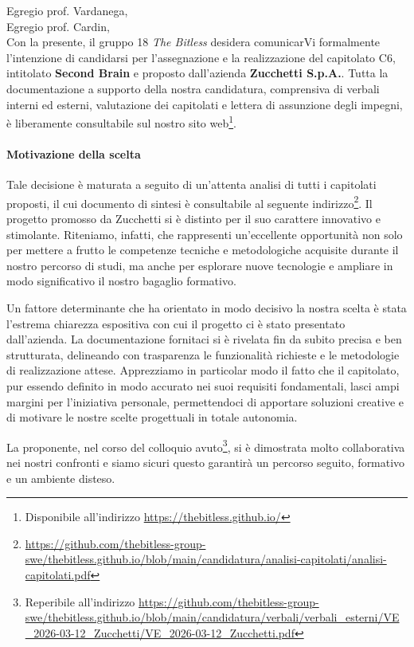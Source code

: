 \documentclass[a4paper, 10pt, colorlinks=true, linkcolor=black, urlcolor=blue, citecolor=blue, hidelinks]{article}
\begin{document}

\newpage

\noindent Egregio prof. Vardanega, \\
Egregio prof. Cardin, \\

\noindent Con la presente, il gruppo 18 \textit{The Bitless} desidera comunicarVi formalmente l'intenzione di candidarsi per l'assegnazione e la realizzazione del capitolato C6, intitolato \textbf{Second Brain} e proposto dall'azienda \textbf{Zucchetti S.p.A.}.
Tutta la documentazione a supporto della nostra candidatura, comprensiva di verbali interni ed esterni, valutazione dei capitolati e lettera di assunzione degli impegni, è liberamente consultabile sul nostro sito web\footnote{Disponibile all'indirizzo \url{https://thebitless.github.io/}}.

\paragraph{Motivazione della scelta}
Tale decisione è maturata a seguito di un'attenta analisi di tutti i capitolati proposti, il cui documento di sintesi è consultabile al seguente indirizzo\footnote{\url{https://github.com/thebitless-group-swe/thebitless.github.io/blob/main/candidatura/analisi-capitolati/analisi-capitolati.pdf}}.
Il progetto promosso da Zucchetti si è distinto per il suo carattere innovativo e stimolante. Riteniamo, infatti, che rappresenti un'eccellente opportunità non solo per mettere a frutto le competenze tecniche e metodologiche acquisite durante il nostro percorso di studi, ma anche per esplorare nuove tecnologie e ampliare in modo significativo il nostro bagaglio formativo. 

Un fattore determinante che ha orientato in modo decisivo la nostra scelta è stata l'estrema chiarezza espositiva con cui il progetto ci è stato presentato dall'azienda. La documentazione fornitaci si è rivelata fin da subito precisa e ben strutturata, delineando con trasparenza le funzionalità richieste e le metodologie di realizzazione attese. Apprezziamo in particolar modo il fatto che il capitolato, pur essendo definito in modo accurato nei suoi requisiti fondamentali, lasci ampi margini per l'iniziativa personale, permettendoci di apportare soluzioni creative e di motivare le nostre scelte progettuali in totale autonomia.

La proponente, nel corso del colloquio avuto\footnote{Reperibile all'indirizzo \url{https://github.com/thebitless-group-swe/thebitless.github.io/blob/main/candidatura/verbali/verbali_esterni/VE_2026-03-12_Zucchetti/VE_2026-03-12_Zucchetti.pdf}}, si è dimostrata molto collaborativa nei nostri confronti e siamo sicuri questo garantirà un percorso seguito, formativo e un ambiente disteso.
\end{document}
